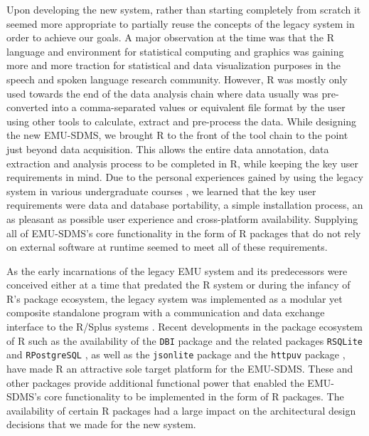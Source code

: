 \documentclass[]{book}
\theoremstyle{definition}
\theoremstyle{definition}
\theoremstyle{definition}
\theoremstyle{remark}
\begin{document}
Upon developing the new system, rather than starting completely from
scratch it seemed more appropriate to partially reuse the concepts of
the legacy system in order to achieve our goals. A major observation at
the time was that the R language and environment for statistical
computing and graphics \citep{r-core-team:2016a} was gaining more and
more traction for statistical and data visualization purposes in the
speech and spoken language research community. However, R was mostly
only used towards the end of the data analysis chain where data usually
was pre-converted into a comma-separated values or equivalent file
format by the user using other tools to calculate, extract and
pre-process the data. While designing the new EMU-SDMS, we brought R to
the front of the tool chain to the point just beyond data acquisition.
This allows the entire data annotation, data extraction and analysis
process to be completed in R, while keeping the key user requirements in
mind. Due to the personal experiences gained by using the legacy system
in various undergraduate courses \citep[course material usually based
on][]{harrington:2010a}, we learned that the key user requirements were
data and database portability, a simple installation process, an as
pleasant as possible user experience and cross-platform availability.
Supplying all of EMU-SDMS's core functionality in the form of R packages
that do not rely on external software at runtime seemed to meet all of
these requirements.

As the early incarnations of the legacy EMU system and its predecessors
were conceived either at a time that predated the R system or during the
infancy of R's package ecosystem, the legacy system was implemented as a
modular yet composite standalone program with a communication and data
exchange interface to the R/Splus systems \citep[see][ Section 3 for
details]{cassidy:sc2001a}. Recent developments in the package ecosystem
of R such as the availability of the \texttt{DBI} package
\citep{r-special-interest-group-on-databases-r-sig-db:2016a} and the
related packages \texttt{RSQLite} and \texttt{RPostgreSQL}
\citep[\citet{conway:2016a}]{wickham:2014a}, as well as the
\texttt{jsonlite} package \citep{ooms:as2014a} and the \texttt{httpuv}
package \citep{rstudio:2015a}, have made R an attractive sole target
platform for the EMU-SDMS. These and other packages provide additional
functional power that enabled the EMU-SDMS's core functionality to be
implemented in the form of R packages. The availability of certain R
packages had a large impact on the architectural design decisions that
we made for the new system.
\end{document}

